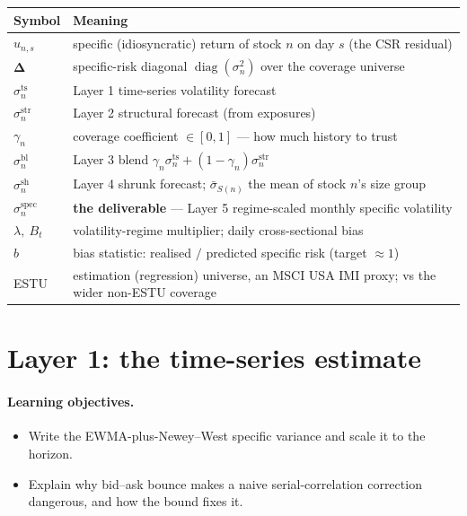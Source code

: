 \documentclass[11pt]{article}
\theoremstyle{definition}
\theoremstyle{plain}
\theoremstyle{remark}
\DeclareMathOperator{\diag}{diag}
\newcommand{\Del}{\boldsymbol{\Delta}}
\begin{document}
\begin{center}
\begin{tabular}{@{}ll@{}}
\toprule
Symbol & Meaning \\
\midrule
$u_{n,s}$ & specific (idiosyncratic) return of stock $n$ on day $s$ (the CSR residual) \\
$\Del$ & specific-risk diagonal $\diag(\sigma_n^2)$ over the coverage universe \\
$\sigma^{\text{ts}}_n$ & Layer 1 time-series volatility forecast \\
$\sigma^{\text{str}}_n$ & Layer 2 structural forecast (from exposures) \\
$\gamma_n$ & coverage coefficient $\in[0,1]$ --- how much history to trust \\
$\sigma^{\text{bl}}_n$ & Layer 3 blend $\gamma_n\sigma^{\text{ts}}_n+(1-\gamma_n)\sigma^{\text{str}}_n$ \\
$\sigma^{\text{sh}}_n$ & Layer 4 shrunk forecast; $\bar\sigma_{S(n)}$ the mean of stock $n$'s size group \\
$\sigma^{\text{spec}}_n$ & \textbf{the deliverable} --- Layer 5 regime-scaled monthly specific volatility \\
$\lambda,\ B_t$ & volatility-regime multiplier; daily cross-sectional bias \\
$b$ & bias statistic: realised $/$ predicted specific risk (target $\approx 1$) \\
ESTU & estimation (regression) universe, an MSCI USA IMI proxy; vs the wider non-ESTU coverage \\
\bottomrule
\end{tabular}
\end{center}

\section{Layer 1: the time-series estimate}\label{sec:ts}

\paragraph{Learning objectives.}
\begin{itemize}[leftmargin=1.4em,topsep=2pt]
  \item Write the EWMA-plus-Newey--West specific variance and scale it to the horizon.
  \item Explain why bid--ask bounce makes a naive serial-correlation correction dangerous, and how the bound fixes it.
\end{itemize}
\end{document}
